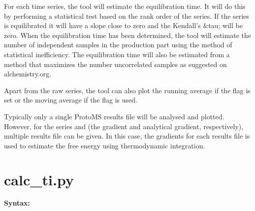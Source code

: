 \documentclass[letterpaper,10pt,english]{sphinxmanual}
\begin{document}
For each time series, the tool will estimate the equilibration time. It will do this by performing a statistical test based on the rank order of the series. If the series is equilibrated it will have a slope close to zero and the Kendall's \&tau; will be zero. When the equilibration time has been determined, the tool will estimate the number of independent samples in the production part using the method of statistical inefficiency. The equilibration time will also be estimated from a method that maximizes the number uncorrelated samples as suggested on alchemistry.org.

Apart from the raw series, the tool can also plot the running average if the  flag is set or the moving average if the  flag is used.

Typically only a single ProtoMS results file will be analysed and plotted. However, for the series  and  (the gradient and analytical gradient, respectively), multiple results file can be given. In this case, the gradients for each results file is used to estimate the free energy using thermodynamic integration.


\section{calc\_ti.py}
\label{tools:calc-ti-py}
\textbf{Syntax:}
\end{document}

